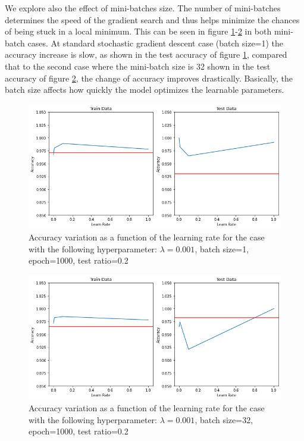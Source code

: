 We explore also the effect of mini-batches size. The number of mini-batches determines the speed of the gradient search and thus helps minimize the chances of being stuck in a local minimum. This can be seen in figure \ref{fig:MS1}-\ref{fig:MS32} in both mini-batch cases. At standard stochastic gradient descent case (batch size=1) the accuracy increase is slow, as shown in the test accuracy of figure \ref{fig:MS1}, compared that to the second case where the mini-batch size is 32 shown in the test accuracy of figure \ref{fig:MS32}, the change of accuracy improves drastically. Basically, the batch size affects how quickly the model optimizes the learnable parameters. 



\begin{figure}[H]
    \centering
    \includegraphics[width=1\linewidth]{Images/MS1.png}
    \caption{Accuracy variation as a function of the learning rate for the case with the following hyperparameter: $\lambda=0.001$, batch size=1, epoch=1000, test ratio=0.2}
    \label{fig:MS1}
\end{figure}

\begin{figure}[H]
    \centering
    \includegraphics[width=1\linewidth]{Images/MS32.png}
    \caption{Accuracy variation as a function of the learning rate for the case with the following hyperparameter: $\lambda=0.001$, batch size=32, epoch=1000, test ratio=0.2}
    \label{fig:MS32}
\end{figure}